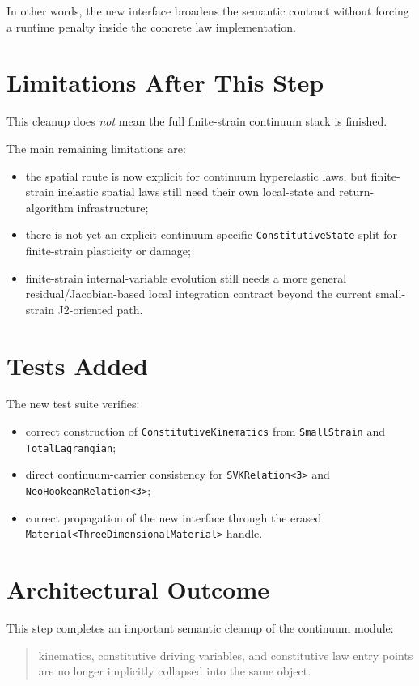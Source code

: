 In other words, the new interface broadens the semantic contract without
forcing a runtime penalty inside the concrete law implementation.

\section{Limitations After This Step}

This cleanup does \emph{not} mean the full finite-strain continuum stack is
finished.

The main remaining limitations are:
\begin{itemize}
  \item the spatial route is now explicit for continuum hyperelastic laws, but
        finite-strain inelastic spatial laws still need their own local-state
        and return-algorithm infrastructure;
  \item there is not yet an explicit continuum-specific
        \texttt{ConstitutiveState} split for finite-strain plasticity or damage;
  \item finite-strain internal-variable evolution still needs a more general
        residual/Jacobian-based local integration contract beyond the current
        small-strain J2-oriented path.
\end{itemize}

\section{Tests Added}

The new test suite verifies:
\begin{itemize}
  \item correct construction of \texttt{ConstitutiveKinematics} from
        \texttt{SmallStrain} and \texttt{TotalLagrangian};
  \item direct continuum-carrier consistency for
        \texttt{SVKRelation<3>} and \texttt{NeoHookeanRelation<3>};
  \item correct propagation of the new interface through the erased
        \texttt{Material<ThreeDimensionalMaterial>} handle.
\end{itemize}

\section{Architectural Outcome}

This step completes an important semantic cleanup of the continuum module:
\begin{quote}
kinematics, constitutive driving variables, and constitutive law entry points
are no longer implicitly collapsed into the same object.
\end{quote}

